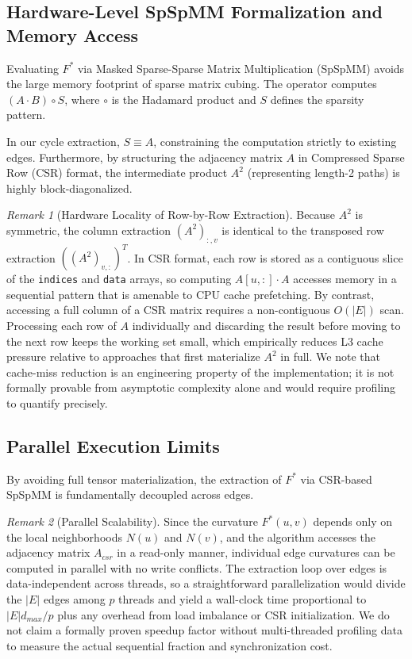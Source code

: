 \documentclass{siuro250211}
\theoremstyle{remark}
\newtheorem{remark}{Remark}
\theoremstyle{plain}
\begin{document}
\subsection{Hardware-Level SpSpMM Formalization and Memory Access}
Evaluating $F^*$ via Masked Sparse-Sparse Matrix Multiplication (SpSpMM) avoids the large memory footprint of sparse matrix cubing. The operator computes $(A \cdot B) \circ S$, where $\circ$ is the Hadamard product and $S$ defines the sparsity pattern.

In our cycle extraction, $S \equiv A$, constraining the computation strictly to existing edges. Furthermore, by structuring the adjacency matrix $A$ in Compressed Sparse Row (CSR) format, the intermediate product $A^2$ (representing length-2 paths) is highly block-diagonalized. 

\begin{remark}[Hardware Locality of Row-by-Row Extraction]
Because $A^2$ is symmetric, the column extraction $(A^2)_{:,v}$ is identical to the transposed row extraction $((A^2)_{v,:})^T$. In CSR format, each row is stored as a contiguous slice of the \texttt{indices} and \texttt{data} arrays, so computing $A[u,:]\cdot A$ accesses memory in a sequential pattern that is amenable to CPU cache prefetching. By contrast, accessing a full column of a CSR matrix requires a non-contiguous $O(|E|)$ scan. Processing each row of $A$ individually and discarding the result before moving to the next row keeps the working set small, which empirically reduces L3 cache pressure relative to approaches that first materialize $A^2$ in full. We note that cache-miss reduction is an engineering property of the implementation; it is not formally provable from asymptotic complexity alone and would require profiling to quantify precisely.
\end{remark}

\subsection{Parallel Execution Limits}
By avoiding full tensor materialization, the extraction of $F^*$ via CSR-based SpSpMM is fundamentally decoupled across edges.

\begin{remark}[Parallel Scalability]
Since the curvature $F^*(u,v)$ depends only on the local neighborhoods $N(u)$ and $N(v)$, and the algorithm accesses the adjacency matrix $A_{csr}$ in a read-only manner, individual edge curvatures can be computed in parallel with no write conflicts. The extraction loop over edges is data-independent across threads, so a straightforward parallelization would divide the $|E|$ edges among $p$ threads and yield a wall-clock time proportional to $|E|d_{max}/p$ plus any overhead from load imbalance or CSR initialization. We do not claim a formally proven speedup factor without multi-threaded profiling data to measure the actual sequential fraction and synchronization cost.
\end{remark}
\end{document}
